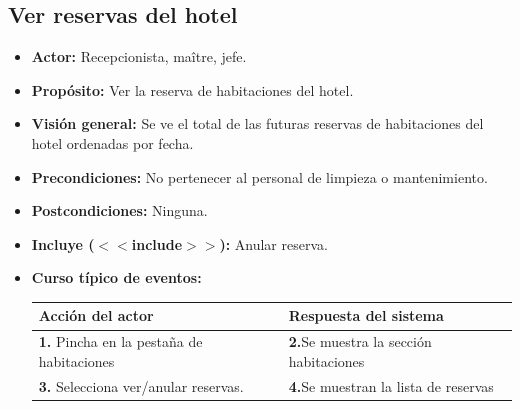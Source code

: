 \documentclass[spanish,a4paper,11pt, twoside]{report}	%
\begin{document}
	\subsection{Ver reservas del hotel}
		\begin{itemize}
			\item \textbf{Actor:} Recepcionista, maître, jefe.
			\item \textbf{Propósito:} Ver la reserva de habitaciones del hotel.
			\item \textbf{Visión general:} Se ve el total de las futuras reservas de habitaciones del hotel ordenadas por fecha.
			\item \textbf{Precondiciones:} No pertenecer al personal de limpieza o mantenimiento.
			\item \textbf{Postcondiciones:} Ninguna.
			\item \textbf{Incluye ($<<$include$>>$):} Anular reserva.
			\item \textbf{Curso típico de eventos:} 	\\
				\begin{tabular}{|p{6cm}||p{6cm}|}
				\hline
				\textbf{Acción del actor} & \textbf{Respuesta del sistema} \\ \hline
				\textbf{1.} Pincha en la pestaña de habitaciones & \textbf{2.}Se muestra la sección habitaciones \\ \hline 
				\textbf{3.} Selecciona ver/anular reservas. & \textbf{4.}Se muestran la lista de reservas \\ \hline
			\end{tabular}
			\\
		\end {itemize}

\end{document}
